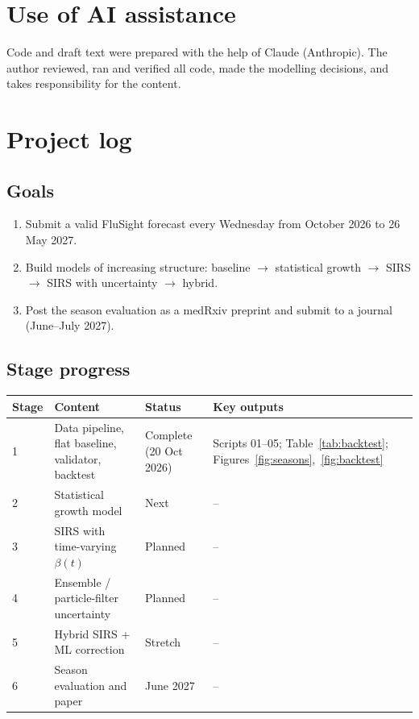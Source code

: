 \documentclass[11pt]{article}
\begin{document}
\section*{Use of AI assistance}
Code and draft text were prepared with the help of Claude (Anthropic). The author
reviewed, ran and verified all code, made the modelling decisions, and takes
responsibility for the content.




\appendix
\section{Project log}
\label{app:log}

\subsection{Goals}
\begin{enumerate}[nosep]
  \item Submit a valid FluSight forecast every Wednesday from October 2026 to
        26 May 2027.
  \item Build models of increasing structure: baseline $\to$ statistical growth
        $\to$ SIRS $\to$ SIRS with uncertainty $\to$ hybrid.
  \item Post the season evaluation as a medRxiv preprint and submit to a journal
        (June--July 2027).
\end{enumerate}

\subsection{Stage progress}
\begin{center}
\begin{tabular}{>{\raggedright}p{1.6cm} >{\raggedright}p{5.2cm} p{2.4cm} p{4.6cm}}
  \toprule
  Stage & Content & Status & Key outputs \\
  \midrule
  1 & Data pipeline, flat baseline, validator, backtest & Complete (20 Oct 2026) &
      Scripts 01--05; Table~\ref{tab:backtest}; Figures~\ref{fig:seasons},~\ref{fig:backtest} \\
  2 & Statistical growth model & Next & -- \\
  3 & SIRS with time-varying $\beta(t)$ & Planned & -- \\
  4 & Ensemble / particle-filter uncertainty & Planned & -- \\
  5 & Hybrid SIRS + ML correction & Stretch & -- \\
  6 & Season evaluation and paper & June 2027 & -- \\
  \bottomrule
\end{tabular}
\end{center}
\end{document}
